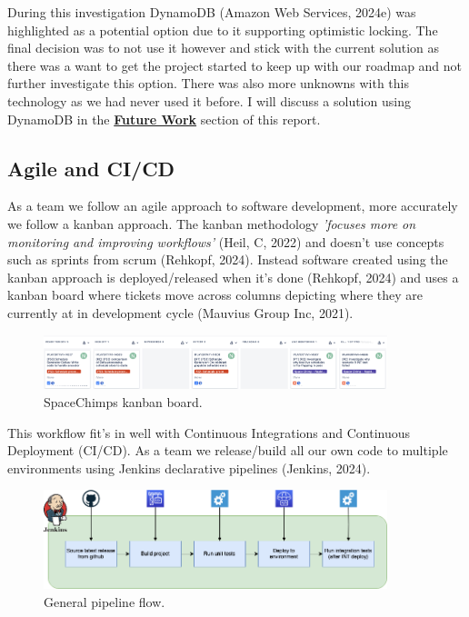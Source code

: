   During this investigation DynamoDB (Amazon Web Services, 2024e) was highlighted as a potential option due to it supporting optimistic
  locking. The final decision was to not use it however and stick with the current solution as there was a want to get the project started to keep 
  up with our roadmap and not further investigate this option. There was also more unknowns with this technology as we had never used it before.
  I will discuss a solution using DynamoDB in the \hyperref[sec:future]{\textbf{Future Work}} section of this report.
   
  \subsection{Agile and CI/CD}
  \label{sec:cicd}

  As a team we follow an agile approach to software development, more accurately we follow a kanban approach. The kanban methodology 
  \textit{'focuses more on monitoring and improving workflows'} (Heil, C, 2022) and doesn't use concepts such as sprints from scrum (Rehkopf, 2024). 
  Instead software created using the kanban approach is deployed/released when it's done (Rehkopf, 2024) and uses a kanban board where tickets move 
  across columns depicting where they are currently at in development cycle (Mauvius Group Inc, 2021).

  \begin{figure}[H]
    \centering
    \includegraphics[width=10cm]{assets/kanbanBoard.png}
    \caption{SpaceChimps kanban board.}
    \label{fig:kanbanBoard}
  \end{figure}

  This workflow fit's in well with Continuous Integrations and Continuous Deployment (CI/CD). As a team we release/build all our own code to 
  multiple environments using Jenkins declarative pipelines (Jenkins, 2024).

  \begin{figure}[H]
    \centering
    \includegraphics[width=10cm]{assets/pipeline.drawio.png}
    \caption{General pipeline flow.}
    \label{fig:pipeline}
  \end{figure}

